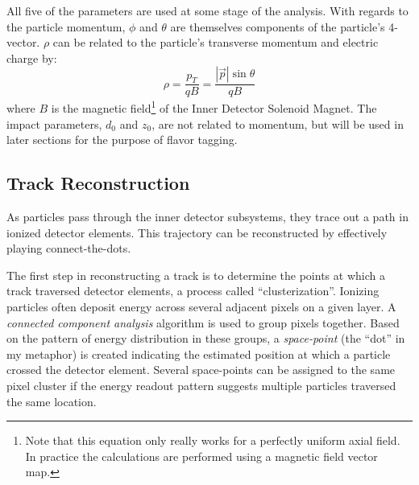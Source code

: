             All five of the parameters are used at some stage of the analysis.
            With regards to the particle momentum, $\phi$ and $\theta$ are themselves components of the particle's 4-vector.
            $\rho$ can be related to the particle's transverse momentum and electric charge by:
            \begin{equation}
                \rho = \frac{p_T}{qB} = \frac{|\vec{p}| \sin \theta}{qB}
            \end{equation}
            where $B$ is the magnetic field\footnote{
                    Note that this equation only really works for a perfectly uniform axial field.
                    In practice the calculations are performed using a magnetic field vector map.
                } of the Inner Detector Solenoid Magnet\cite{thesis_track_sim_and_reco}.
            The impact parameters, $d_0$ and $z_0$, are not related to momentum,
                but will be used in later sections for the purpose of flavor tagging.

        \FloatBarrier
        \subsection{Track Reconstruction}

            As particles pass through the inner detector subsystems, they trace out a path in ionized detector elements.
            This trajectory can be reconstructed by effectively playing connect-the-dots.

            The first step in reconstructing a track is to determine the points at which a track traversed detector elements,
                a process called ``clusterization''\cite{atlas_track_reco_performance}.
            Ionizing particles often deposit energy across several adjacent pixels on a given layer.
            A \textit{connected component analysis} algorithm\cite{connected_component_analysis}
                is used to group pixels together.
            Based on the pattern of energy distribution in these groups,
                a \textit{space-point} (the ``dot'' in my metaphor) 
                is created indicating the estimated position at which a particle crossed the detector element.
            Several space-points can be assigned to the same pixel cluster
                if the energy readout pattern suggests multiple particles traversed the same location.

